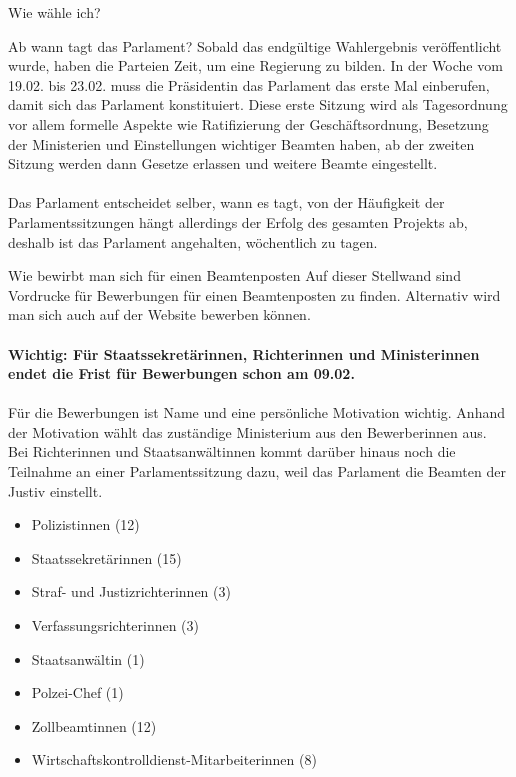 \documentclass{sasbase}
\begin{document}
\begin{question}{Wie wähle ich?}
\begin{question}{Ab wann tagt das Parlament?}
    Sobald das endgültige Wahlergebnis veröffentlicht wurde, haben die Parteien Zeit, um eine Regierung zu bilden. 
    In der Woche vom 19.02. bis 23.02. muss die Präsidentin das Parlament das erste Mal einberufen, damit sich das Parlament konstituiert.
    Diese erste Sitzung wird als Tagesordnung vor allem formelle Aspekte wie Ratifizierung der Geschäftsordnung, Besetzung der Ministerien und Einstellungen wichtiger Beamten haben, 
    ab der zweiten Sitzung werden dann Gesetze erlassen und weitere Beamte eingestellt.
    \\
    \\
    Das Parlament entscheidet selber, wann es tagt, von der Häufigkeit der Parlamentssitzungen hängt allerdings der Erfolg des gesamten Projekts ab, deshalb
    ist das Parlament angehalten, wöchentlich zu tagen.
    
\end{question}
\begin{question}{Wie bewirbt man sich für einen Beamtenposten}
    Auf dieser Stellwand sind Vordrucke für Bewerbungen für einen Beamtenposten zu finden. Alternativ wird man sich auch auf der Website bewerben können.\\\\
    \textbf{Wichtig: Für Staatssekretärinnen, Richterinnen und Ministerinnen endet die Frist für Bewerbungen schon am 09.02.} \\\\Für die Bewerbungen ist Name und eine persönliche Motivation wichtig. Anhand der Motivation
    wählt das zuständige Ministerium aus den Bewerberinnen aus. \\
    Bei Richterinnen und Staatsanwältinnen kommt darüber hinaus noch die Teilnahme an einer Parlamentssitzung dazu, weil das Parlament die Beamten der Justiv einstellt.
\end{question}

\begin{itemize}
        \item Polizistinnen (12)
        \item Staatssekretärinnen (15)
        \item Straf- und Justizrichterinnen (3)
        \item Verfassungsrichterinnen (3)
        \item Staatsanwältin (1)
        \item Polzei-Chef (1)
        \item Zollbeamtinnen (12)
        \item Wirtschaftskontrolldienst-Mitarbeiterinnen (8)
    \end{itemize}
\end{question}
\end{document}
